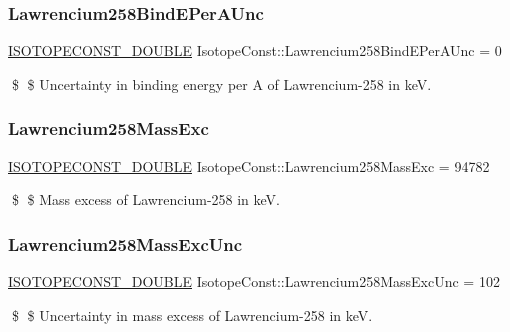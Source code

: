 \subsubsection{\texorpdfstring{Lawrencium258\+Bind\+E\+Per\+A\+Unc}{Lawrencium258BindEPerAUnc}}
{\footnotesize\ttfamily \mbox{\hyperlink{group___isotope_const-_macros_ga8f45a7272ce02c0b4c65c44636ed719a}{I\+S\+O\+T\+O\+P\+E\+C\+O\+N\+S\+T\+\_\+\+D\+O\+U\+B\+LE}} Isotope\+Const\+::\+Lawrencium258\+Bind\+E\+Per\+A\+Unc = 0}

\$ \$ Uncertainty in binding energy per A of Lawrencium-\/258 in keV. \mbox{\label{group___isotope_const-_lawrencium-_lr258_gae055d5efc5999215947c37af639dd874}} 
\subsubsection{\texorpdfstring{Lawrencium258\+Mass\+Exc}{Lawrencium258MassExc}}
{\footnotesize\ttfamily \mbox{\hyperlink{group___isotope_const-_macros_ga8f45a7272ce02c0b4c65c44636ed719a}{I\+S\+O\+T\+O\+P\+E\+C\+O\+N\+S\+T\+\_\+\+D\+O\+U\+B\+LE}} Isotope\+Const\+::\+Lawrencium258\+Mass\+Exc = 94782}

\$ \$ Mass excess of Lawrencium-\/258 in keV. \mbox{\label{group___isotope_const-_lawrencium-_lr258_ga6e2d2ec0901e18663c41d2918178a148}} 
\subsubsection{\texorpdfstring{Lawrencium258\+Mass\+Exc\+Unc}{Lawrencium258MassExcUnc}}
{\footnotesize\ttfamily \mbox{\hyperlink{group___isotope_const-_macros_ga8f45a7272ce02c0b4c65c44636ed719a}{I\+S\+O\+T\+O\+P\+E\+C\+O\+N\+S\+T\+\_\+\+D\+O\+U\+B\+LE}} Isotope\+Const\+::\+Lawrencium258\+Mass\+Exc\+Unc = 102}

\$ \$ Uncertainty in mass excess of Lawrencium-\/258 in keV. \mbox{\label{group___isotope_const-_lawrencium-_lr258_gac40644ea918878426509981029f5450d}} 

